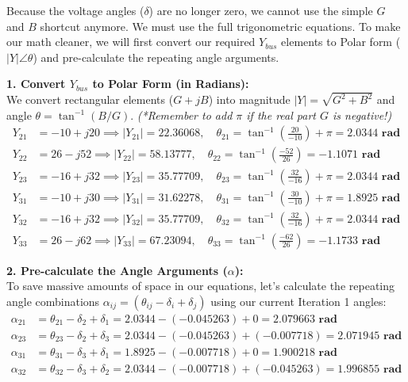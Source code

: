 \documentclass[11pt]{article}
\begin{document}
\begin{stepbox}
Because the voltage angles ($\delta$) are no longer zero, we cannot use the simple $G$ and $B$ shortcut anymore. We must use the full trigonometric equations. To make our math cleaner, we will first convert our required $Y_{bus}$ elements to Polar form ($|Y| \angle \theta$) and pre-calculate the repeating angle arguments.

\textbf{1. Convert $Y_{bus}$ to Polar Form (in Radians):}\\
We convert rectangular elements ($G + jB$) into magnitude $|Y| = \sqrt{G^2 + B^2}$ and angle $\theta = \tan^{-1}(B/G)$. \textit{(*Remember to add $\pi$ if the real part $G$ is negative!)}
\begin{align*}
    Y_{21} &= -10 + j20 \implies |Y_{21}| = \mathbf{22.36068}, \quad \theta_{21} = \tan^{-1}\left(\frac{20}{-10}\right) + \pi = \mathbf{2.0344 \text{ rad}} \\[0.2cm]
    Y_{22} &= 26 - j52 \implies |Y_{22}| = \mathbf{58.13777}, \quad \theta_{22} = \tan^{-1}\left(\frac{-52}{26}\right) = \mathbf{-1.1071 \text{ rad}} \\[0.2cm]
    Y_{23} &= -16 + j32 \implies |Y_{23}| = \mathbf{35.77709}, \quad \theta_{23} = \tan^{-1}\left(\frac{32}{-16}\right) + \pi = \mathbf{2.0344 \text{ rad}} \\[0.2cm]
    Y_{31} &= -10 + j30 \implies |Y_{31}| = \mathbf{31.62278}, \quad \theta_{31} = \tan^{-1}\left(\frac{30}{-10}\right) + \pi = \mathbf{1.8925 \text{ rad}} \\[0.2cm]
    Y_{32} &= -16 + j32 \implies |Y_{32}| = \mathbf{35.77709}, \quad \theta_{32} = \tan^{-1}\left(\frac{32}{-16}\right) + \pi = \mathbf{2.0344 \text{ rad}} \\[0.2cm]
    Y_{33} &= 26 - j62 \implies |Y_{33}| = \mathbf{67.23094}, \quad \theta_{33} = \tan^{-1}\left(\frac{-62}{26}\right) = \mathbf{-1.1733 \text{ rad}}
\end{align*}

\textbf{2. Pre-calculate the Angle Arguments ($\alpha$):}\\
To save massive amounts of space in our equations, let's calculate the repeating angle combinations $\alpha_{ij} = (\theta_{ij} - \delta_i + \delta_j)$ using our current Iteration 1 angles:
\begin{align*}
    \alpha_{21} &= \theta_{21} - \delta_2 + \delta_1 = 2.0344 - (-0.045263) + 0 = \mathbf{2.079663 \text{ rad}} \\
    \alpha_{23} &= \theta_{23} - \delta_2 + \delta_3 = 2.0344 - (-0.045263) + (-0.007718) = \mathbf{2.071945 \text{ rad}} \\
    \alpha_{31} &= \theta_{31} - \delta_3 + \delta_1 = 1.8925 - (-0.007718) + 0 = \mathbf{1.900218 \text{ rad}} \\
    \alpha_{32} &= \theta_{32} - \delta_3 + \delta_2 = 2.0344 - (-0.007718) + (-0.045263) = \mathbf{1.996855 \text{ rad}}
\end{align*}
\end{stepbox}
\end{document}

